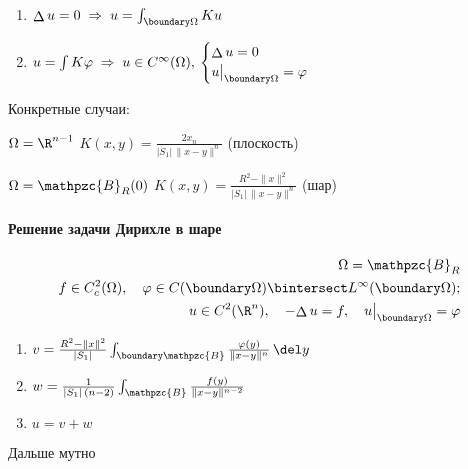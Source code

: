 \documentclass[exam]{trchesh}
\newcommand{\laplop}{\mathop{\Delta}}
\def\Ball{\mathpzc{B}}
\def\defsign{\hbox{$\,\Rrightarrow\,$}}
\newcommand{\deflabel}[1]{
  \makebox[\labelwidth][l]{%
    \parbox[t]{\labelwidth}{\hspace{0pt}\textsf{#1}}%
  }~\defsign
}
\newenvironment{defs}[1][\hspace{12ex}]%
  {\begin{list}{}{%
        \let \makelabel=\deflabel%
        \setlength{\labelwidth}{\widthof{#1}} %
        \setlength{\leftmargin}{\labelwidth+\labelsep}%
        \itemsep=0pt %
      }}%
  {\end{list}}
\begin{document}
\begin{enumerate}
  \item $\laplop u = 0 \;\Rightarrow\; u = \int_{\boundary \Omega} K u $
  \item $u = \int K \varphi \;\Rightarrow\; u \in C^\infty(\Omega), \:
    \begin{cases}\laplop u = 0 \\ u \big|_{\boundary \Omega} = \varphi\end{cases} $
\end{enumerate}

Конкретные случаи:
\begin{defs}
\item[$\Omega = \R^{n-1}$] $K(x,y) = \frac{2 x_n}{|S_1|\, \|x-y\|^n}$ (плоскость)
\item[$\Omega = \Ball_R(0)$] $K(x,y) = \frac{R^2 - \|x\|^2}{|S_1|\, \|x-y\|^n}$ (шар)
\end{defs}

\paragraph{Решение задачи Дирихле в шаре}
\[
  \begin{split}
    \Omega = \Ball_R \\
    f\in C^2_c(\Omega), \quad \varphi \in C(\boundary \Omega) \bintersect L^\infty(\boundary \Omega) ; \\
    u \in C^2(\R^n), \quad -\!\laplop u = f, \quad u\big|_{\boundary \Omega} = \varphi 
  \end{split}
\]
\begin{enumerate}
  \item $v = \frac{R^2 - \|x\|^2}{|S_1|} \int_{\boundary\Ball} \frac{\varphi(y)}{\|x-y\|^n} \, \del y$
  \item $w = \frac{1}{|S_1|\,(n-2)} \int_\Ball \frac{f(y)}{\|x-y\|^{n-2}}$
  \item $u = v + w$
\end{enumerate}
Дальше мутно
\end{document}
